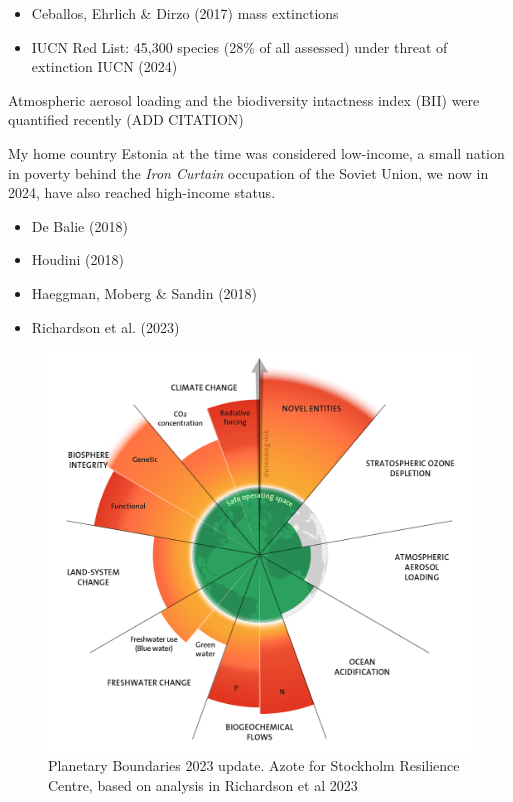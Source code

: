 \documentclass[
  letterpaper,
  DIV=11,
  numbers=noendperiod]{scrartcl}
\providecommand{\tightlist}{%
  \setlength{\itemsep}{0pt}\setlength{\parskip}{0pt}}\usepackage{longtable,booktabs,array}
\begin{document}
\begin{itemize}
\tightlist
\item
  Ceballos, Ehrlich \& Dirzo (2017) mass extinctions
\item
  IUCN Red List: 45,300 species (28\% of all assessed) under threat of
  extinction IUCN (2024)
\end{itemize}

Atmospheric aerosol loading and the biodiversity intactness index (BII)
were quantified recently (ADD CITATION)

My home country Estonia at the time was considered low-income, a small
nation in poverty behind the \emph{Iron Curtain} occupation of the
Soviet Union, we now in 2024, have also reached high-income status.

\begin{itemize}
\item
  De Balie (2018)
\item
  Houdini (2018)
\item
  Haeggman, Moberg \& Sandin (2018)
\item
  Richardson et al. (2023)
\end{itemize}

\begin{figure}[H]

{\centering \includegraphics[width=1\linewidth,height=\textheight,keepaspectratio]{./images/sustainability/planetary-boundaries-2023.png}

}

\caption{Planetary Boundaries 2023 update. Azote for Stockholm
Resilience Centre, based on analysis in Richardson et al 2023}

\end{figure}%
\end{document}
